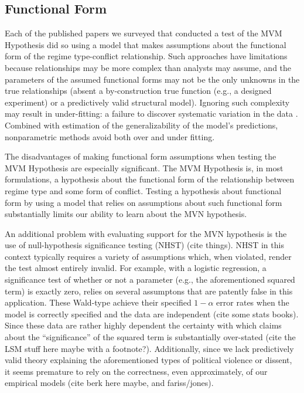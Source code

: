 \documentclass[titlepage, onecolumn,12pt]{article}
\begin{document}
\subsection{Functional Form}

Each of the published papers we surveyed that conducted a test of the MVM Hypothesis did so using a model that makes assumptions about the functional form of the regime type-conflict relationship. Such approaches have limitations because relationships may be more complex than analysts may assume, and the parameters of the assumed functional forms may not be the only unknowns in the true relationships (absent a by-construction true function (e.g., a designed experiment) or a predictively valid structural model). Ignoring such complexity may result in under-fitting: a failure to discover systematic variation in the data \citep{fariss2014reproduction}. Combined with estimation of the generalizability of the model's predictions, nonparametric methods avoid both over and under fitting.

The disadvantages of making functional form assumptions when testing the MVM Hypothesis are especially significant. The MVM Hypothesis is, in most formulations, a hypothesis about the functional form of the relationship between regime type and some form of conflict. Testing a hypothesis about functional form by using a model that relies on assumptions about such functional form substantially limits our ability to learn about the MVN hypothesis.

An additional problem with evaluating support for the MVN hypothesis is the use of null-hypothesis significance testing (NHST) (cite things). NHST in this context typically requires a variety of assumptions which, when violated, render the test almost entirely invalid. For example, with a logistic regression, a significance test of whether or not a parameter (e.g., the aforementioned squared term) is exactly zero, relies on several assumptons that are patently false in this application. These Wald-type achieve their specified $1 - \alpha$ error rates when the model is correctly specified and the data are independent (cite some stats books). Since these data are rather highly dependent the certainty with which claims about the ``significance'' of the squared term is substantially over-stated (cite the LSM stuff here maybe with a footnote?). Additionally, since we lack predictively valid theory explaining the aforementioned types of political violence or dissent, it seems premature to rely on the correctness, even approximately, of our empirical models (cite berk here maybe, and fariss/jones).
\end{document}
